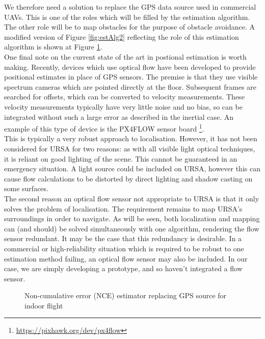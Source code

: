 \documentclass[capstone_report.tex]{subfiles}
\begin{document}
We therefore need a solution to replace the GPS data source used in commercial UAVs. This is one of the roles which will be filled by the estimation algorithm. The other role will be to map obstacles for the purpose of obstacle avoidance. A modified version of Figure \ref{fig:estAlg2} reflecting the role of this estimation algorithm is shown at Figure \ref{fig:estAlg3}.\\

One final note on the current state of the art in postional estimation is worth making. Recently, devices which use optical flow have been developed to provide positional estimates in place of GPS sensors. The premise is that they use visible spectrum cameras which are pointed directly at the floor. Subsequent frames are searched for offsets, which can be converted to velocity measurements. These velocity measurements typically have very little noise and no bias, so can be integrated without such a large error as described in the inertial case. An example of this type of device is the PX4FLOW sensor board \footnote{\url{https://pixhawk.org/dev/px4flow}}. \\

This is typically a very robust approach to localisation. However, it has not been considered for URSA for two reasons: as with all visible light optical techniques, it is reliant on good lighting of the scene. This cannot be guaranteed in an emergency situation. A light source could be included on URSA, however this can cause flow calculations to be distorted by direct lighting and shadow casting on some surfaces.\\

The second reason an optical flow sensor not appropriate to URSA is that it only solves the problem of localisation. The requirement remains to map URSA's surroundings in order to navigate. As will be seen, both localization and mapping can (and should) be solved simultaneously with one algorithm, rendering the flow sensor redundant. It may be the case that this redundancy is desirable. In a commercial or high-reliability situation which is required to be robust to one estimation method failing, an optical flow sensor may also be included. In our case, we are simply developing a prototype, and so haven't integrated a flow sensor.

    \begin{figure}[H]
    	\centering
    	
    	\caption{Non-cumulative error (NCE) estimator replacing GPS source for indoor flight\label{fig:estAlg3}}
    \end{figure}
\end{document}
